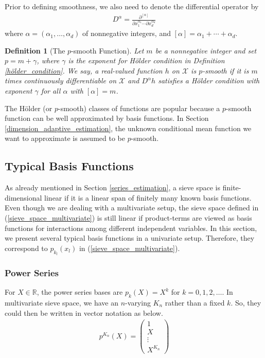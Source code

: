 \documentclass[12pt, a4paper]{article}
\theoremstyle{MAstyle} \newtheorem{assumption}{Assumption}[section]
\theoremstyle{MAstyle} \newtheorem{definition}{Definition}[section]
\theoremstyle{MAstyle} \newtheorem{theorem}{Theorem}[section]
\theoremstyle{MAstyle} \newtheorem{corollary}{Corollary}[section]
\begin{document}
        Prior to defining smoothness, we also need to denote the differential operator by
        \begin{align*}
            D^{\alpha}=\frac{\partial^{[\alpha]}}{\partial x_1^{\alpha_1} \cdots \partial x_d^{\alpha_d}}
        \end{align*}
        where $\alpha=(\alpha_1,\ldots,\alpha_d)$ of nonnegative integers, and $[\alpha]=\alpha_1+\cdots+\alpha_d$. 
        \begin{definition}[The $p$-smooth Function]\label{p-smooth_function}
            Let $m$ be a nonnegative integer and set $p=m+\gamma$, where $\gamma$ is the exponent for Hölder condition in Definition \ref{hölder_condition}. We say, a real-valued function $h$ on $\mathcal{X}$ is $p$-smooth if it is $m$ times continuously differentiable on $\mathcal{X}$ and $D^{\alpha}h$ satisfies a Hölder condition with exponent $\gamma$ for all $\alpha$ with $[\alpha]=m$.
        \end{definition}
        The Hölder (or $p$-smooth) classes of functions are popular because a $p$-smooth function can be well approximated by basis functions. In Section \ref{dimension_adaptive_estimation}, the unknown conditional mean function we want to approximate is assumed to be $p$-smooth.
        
        \subsection{Typical Basis Functions}\label{basis_functions}

        As already mentioned in Section \ref{series_estimation}, a sieve space is finite-dimensional linear if it is a linear span of finitely many known basis functions. Even though we are dealing with a multivariate setup, the sieve space defined in (\ref{sieve_space_multivariate}) is still linear if product-terms are viewed as basis functions for interactions among different independent variables. In this section, we present several typical basis functions in a univariate setup. Therefore, they correspond to $p_{k_l}(x_l)$ in (\ref{sieve_space_multivariate}).

        \subsubsection{Power Series}\label{power_series}
        For $X \in \mathbb{R}$, the power series bases are $p_k(X)=X^{k}$ for $k=0,1,2,\ldots$. In multivariate sieve space, we have an $n$-varying $K_n$ rather than a fixed $k$. So, they could then be written in vector notation as below.
        \begin{align}
            p^{K_n}(X)=  
            \begin{pmatrix}
                 1  \\
                 X  \\
                 \vdots\\
                 X^{K_n}
            \end{pmatrix} 
        \end{align}
\end{document}
